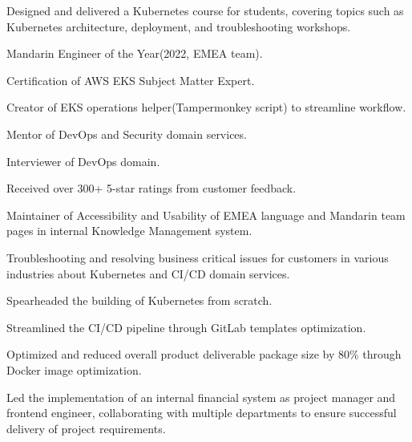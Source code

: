 \documentclass[]{deedy-resume-openfont}
\begin{document}
\begin{minipage}[t]{1\textwidth}
\null\hfill{}
\begin{tightemize}
    \item Designed and delivered a Kubernetes course for students, covering topics such as Kubernetes architecture, deployment, and troubleshooting workshops.
\end{tightemize}
\sectionsep


\null\hfill{}
\begin{tightemize}
    \item Mandarin Engineer of the Year(2022, EMEA team).
    \item Certiﬁcation of AWS EKS Subject Matter Expert.
    \item Creator of EKS operations helper(Tampermonkey script) to streamline workﬂow.
    \item Mentor of DevOps and Security domain services.
    \item Interviewer of DevOps domain.
    \item Received over 300+ 5-star ratings from customer feedback.
    \item Maintainer of Accessibility and Usability of EMEA language and Mandarin team pages in internal Knowledge Management system.
    \item Troubleshooting and resolving business critical issues for customers in various industries about Kubernetes and CI/CD domain services.
\end{tightemize}
\sectionsep

\null\hfill{}
\begin{tightemize}
    \item Spearheaded the building of Kubernetes from scratch.
    \item Streamlined the CI/CD pipeline through GitLab templates optimization.
    \item Optimized and reduced overall product deliverable package size by 80\% through Docker image optimization.
    \item Led the implementation of an internal financial system as project manager and frontend engineer, collaborating with multiple departments to ensure successful delivery of project requirements.
\end{tightemize}
\sectionsep


\end{minipage}
\end{document}
